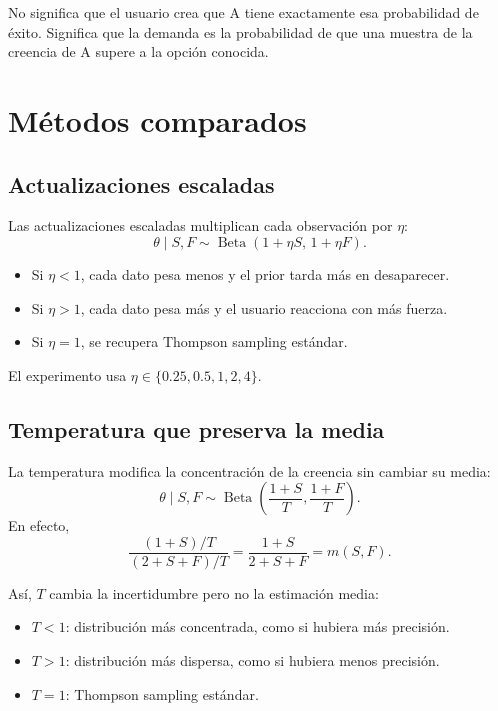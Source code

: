 \documentclass[11pt]{article}
\newcommand{\BetaDist}{\operatorname{Beta}}
\begin{document}
No significa que el usuario crea que A tiene exactamente esa probabilidad de
éxito. Significa que la demanda es la probabilidad de que una muestra de la
creencia de A supere a la opción conocida.

\section{Métodos comparados}

\subsection{Actualizaciones escaladas}

Las actualizaciones escaladas multiplican cada observación por $\eta$:
\begin{equation}
  \theta\mid S,F
  \sim \BetaDist(1+\eta S,\,1+\eta F).
\end{equation}

\begin{itemize}
  \item Si $\eta<1$, cada dato pesa menos y el prior tarda más en desaparecer.
  \item Si $\eta>1$, cada dato pesa más y el usuario reacciona con más fuerza.
  \item Si $\eta=1$, se recupera Thompson sampling estándar.
\end{itemize}

El experimento usa $\eta\in\{0.25,0.5,1,2,4\}$.

\subsection{Temperatura que preserva la media}

La temperatura modifica la concentración de la creencia sin cambiar su media:
\begin{equation}
  \theta\mid S,F
  \sim
  \BetaDist\!\left(\frac{1+S}{T},\frac{1+F}{T}\right).
\end{equation}
En efecto,
\begin{equation}
  \frac{(1+S)/T}{(2+S+F)/T}
  =\frac{1+S}{2+S+F}=m(S,F).
\end{equation}

Así, $T$ cambia la incertidumbre pero no la estimación media:
\begin{itemize}
  \item $T<1$: distribución más concentrada, como si hubiera más precisión.
  \item $T>1$: distribución más dispersa, como si hubiera menos precisión.
  \item $T=1$: Thompson sampling estándar.
\end{itemize}
\end{document}
